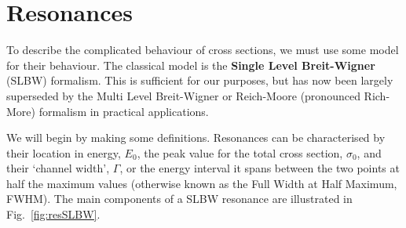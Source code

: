 \section{Resonances}

To describe the complicated behaviour of cross sections, we must use some model for their behaviour. The classical model is the \textbf{Single Level Breit-Wigner} (SLBW) formalism. This is sufficient for our purposes, but has now been largely superseded by the Multi Level Breit-Wigner or Reich-Moore (pronounced Rich-More) formalism in practical applications.

We will begin by making some definitions. Resonances can be characterised by their location in energy, $E_0$, the peak value for the total cross section, $\sigma_0$, and their `channel width', $\Gamma$, or the energy interval it spans between the two points at half the maximum values (otherwise known as the Full Width at Half Maximum, FWHM). The main components of a SLBW resonance are illustrated in Fig.~\ref{fig:resSLBW}.

